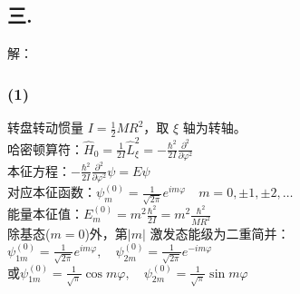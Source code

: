 \subsection{三.}
解：
\subsubsection{ (1)}转盘转动惯量 $I = \frac{1}{2}MR^2$，取 $\xi$ 轴为转轴。\\
 哈密顿算符：$\hat{H}_0 = \frac{1}{2I}\hat{L}_\xi^2 = -\frac{\hbar^2}{2I}\frac{\partial^2}{\partial\varphi^2}$\\
 本征方程：$-\frac{\hbar^2}{2I}\frac{\partial^2}{\partial\varphi^2}\psi = E\psi$\\
对应本征函数：$\psi_m^{(0)} = \frac{1}{\sqrt{2\pi}}e^{im\varphi} \quad  m = 0, \pm1, \pm2, \ldots $\\
能量本征值：$E_m^{(0)} = m^2\frac{\hbar^2}{2I} = m^2\frac{\hbar^2}{MR^2} $\\
除基态($m = 0$)外，第$\left|m\right|$ 激发态能级为二重简并：$\psi_{1m}^{(0)} = \frac{1}{\sqrt{2\pi}}e^{im\varphi}, \quad \psi_{2m}^{(0)} = \frac{1}{\sqrt{2\pi}}e^{-im\varphi}$\\
或$\psi_{1m}^{(0)} = \frac{1}{\sqrt{\pi}}\cos m\varphi, \quad \psi_{2m}^{(0)} = \frac{1}{\sqrt{\pi}}\sin m\varphi $
